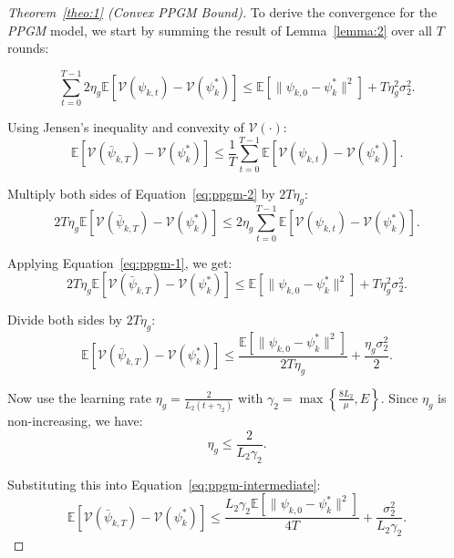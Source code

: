 \documentclass[lettersize,journal]{IEEEtran}
\newtheorem{proof}{Proof}
\begin{document}
\begin{proof}[Theorem~\ref{theo:1} (Convex \emph{PPGM} Bound)]
To derive the convergence for the \emph{PPGM} model, we start by summing the result of Lemma~\ref{lemma:2} over all $T$ rounds:

\begin{equation}
\label{eq:ppgm-1}
    \sum_{t=0}^{T-1} 2\eta_g \mathbb{E}[\mathcal{V}(\psi_{k,t}) - \mathcal{V}(\psi_k^*)] 
    \leq \mathbb{E}[\|\psi_{k,0} - \psi_k^*\|^2] + T\eta_g^2 \sigma_2^2.
\end{equation}

Using Jensen's inequality and convexity of $\mathcal{V}(\cdot)$:
\begin{equation}
\label{eq:ppgm-2}
    \mathbb{E}[\mathcal{V}(\bar{\psi}_{k,T}) - \mathcal{V}(\psi_k^*)] 
    \leq \frac{1}{T} \sum_{t=0}^{T-1} \mathbb{E}[\mathcal{V}(\psi_{k,t}) - \mathcal{V}(\psi_k^*)].
\end{equation}

Multiply both sides of Equation~\eqref{eq:ppgm-2} by $2T\eta_g$:
\begin{equation}
    2T\eta_g \mathbb{E}[\mathcal{V}(\bar{\psi}_{k,T}) - \mathcal{V}(\psi_k^*)] 
    \leq 2\eta_g \sum_{t=0}^{T-1} \mathbb{E}[\mathcal{V}(\psi_{k,t}) - \mathcal{V}(\psi_k^*)].
\end{equation}

Applying Equation~\eqref{eq:ppgm-1}, we get:
\begin{equation}
    2T\eta_g \mathbb{E}[\mathcal{V}(\bar{\psi}_{k,T}) - \mathcal{V}(\psi_k^*)] 
    \leq \mathbb{E}[\|\psi_{k,0} - \psi_k^*\|^2] + T\eta_g^2 \sigma_2^2.
\end{equation}

Divide both sides by $2T\eta_g$:
\begin{equation}
\label{eq:ppgm-intermediate}
    \mathbb{E}[\mathcal{V}(\bar{\psi}_{k,T}) - \mathcal{V}(\psi_k^*)] 
    \leq \frac{\mathbb{E}[\|\psi_{k,0} - \psi_k^*\|^2]}{2T\eta_g} + \frac{\eta_g \sigma_2^2}{2}.
\end{equation}

Now use the learning rate $\eta_g = \frac{2}{L_2(t+\gamma_2)}$ with $\gamma_2 = \max\left\{\frac{8L_2}{\mu}, E\right\}$. Since $\eta_g$ is non-increasing, we have:
\begin{equation}
    \eta_g \leq \frac{2}{L_2 \gamma_2}.
\end{equation}

Substituting this into Equation~\eqref{eq:ppgm-intermediate}:
\begin{equation}
    \mathbb{E}[\mathcal{V}(\bar{\psi}_{k,T}) - \mathcal{V}(\psi_k^*)] 
    \leq \frac{L_2 \gamma_2 \mathbb{E}[\|\psi_{k,0} - \psi_k^*\|^2]}{4T} + \frac{\sigma_2^2}{L_2 \gamma_2}.
\end{equation}


\end{proof}
\end{document}
